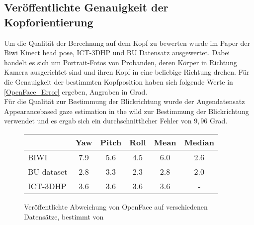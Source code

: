 \subsection{Veröffentlichte Genauigkeit der Kopforientierung}
Um die Qualität der Berechnung auf dem Kopf zu bewerten wurde im Paper \cite{OpenFace} der \glqq Biwi Kinect head pose\grqq \cite{BIWI_database}, \glqq ICT-3DHP\grqq \cite{ICT_database} und \glqq BU Datensatz\grqq \cite{BU_database} ausgewertet. Dabei handelt es sich um Portrait-Fotos von Probanden, deren Körper in Richtung Kamera ausgerichtet sind und ihren Kopf in eine beliebige Richtung drehen. Für die Genauigkeit der bestimmten Kopfposition haben sich folgende Werte in \autoref{OpenFace_Error} ergeben, Angraben in Grad.\\
Für die Qualität zur Bestimmung der Blickrichtung wurde der Augendatensatz \glqq Appearancebased gaze estimation in the wild\grqq \cite{database_Eye_old} zur Bestimmung der Blickrichtung verwendet und es ergab sich ein durchschnittlicher Fehler von $9,96$ Grad.
\begin{figure}[h]
	\centering
	\begin{tabular}{|l|c|c|c||c|c|}
		\hline
		&Yaw&Pitch&Roll&Mean&Median\\\hline
		BIWI&7.9&5.6&4.5&6.0&2.6\\\hline
		BU dataset&2.8&3.3&2.3&2.8&2.0\\\hline
		ICT-3DHP&3.6&3.6&3.6&3.6&-\\\hline
	\end{tabular}
	\caption{Veröffentlichte Abweichung von OpenFace auf verschiedenen Datensätze, bestimmt von \cite{OpenFace}}
	\label{OpenFace_Error}
\end{figure}